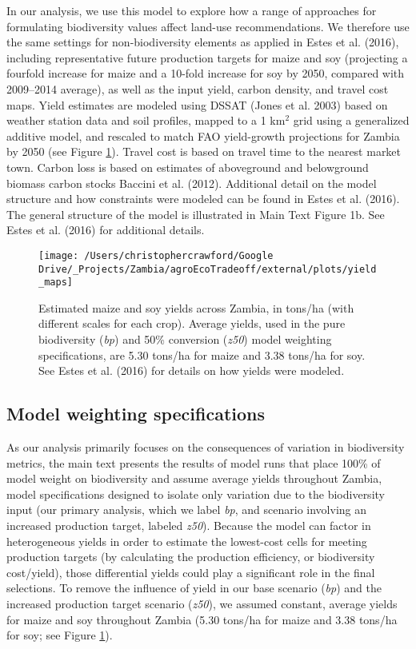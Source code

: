 \documentclass[
]{article}
\begin{document}
In our analysis, we use this model to explore how a range of approaches for formulating biodiversity values affect land-use recommendations. We therefore use the same settings for non-biodiversity elements as applied in Estes et al. (2016), including representative future production targets for maize and soy (projecting a fourfold increase for maize and a 10-fold increase for soy by 2050, compared with 2009--2014 average), as well as the input yield, carbon density, and travel cost maps. Yield estimates are modeled using DSSAT (Jones et al. 2003) based on weather station data and soil profiles, mapped to a 1 km\(^2\) grid using a generalized additive model, and rescaled to match FAO yield-growth projections for Zambia by 2050 (see Figure \ref{fig:yield}). Travel cost is based on travel time to the nearest market town. Carbon loss is based on estimates of aboveground and belowground biomass carbon stocks Baccini et al. (2012). Additional detail on the model structure and how constraints were modeled can be found in Estes et al. (2016). The general structure of the model is illustrated in Main Text Figure 1b. See Estes et al. (2016) for additional details.



\begin{figure}
\texttt{[image: /Users/christophercrawford/Google Drive/\_Projects/Zambia/agroEcoTradeoff/external/plots/yield\_maps]} \caption{Estimated maize and soy yields across Zambia, in tons/ha (with different scales for each crop). Average yields, used in the pure biodiversity (\emph{bp}) and 50\% conversion (\emph{z50}) model weighting specifications, are 5.30 tons/ha for maize and 3.38 tons/ha for soy. See Estes et al. (2016) for details on how yields were modeled.}\label{fig:yield}
\end{figure}

\hypertarget{model-weights}{%
\subsection{Model weighting specifications}\label{model-weights}}

As our analysis primarily focuses on the consequences of variation in biodiversity metrics, the main text presents the results of model runs that place 100\% of model weight on biodiversity and assume average yields throughout Zambia, model specifications designed to isolate only variation due to the biodiversity input (our primary analysis, which we label \emph{bp}, and scenario involving an increased production target, labeled \emph{z50}). Because the model can factor in heterogeneous yields in order to estimate the lowest-cost cells for meeting production targets (by calculating the production efficiency, or biodiversity cost/yield), those differential yields could play a significant role in the final selections. To remove the influence of yield in our base scenario (\emph{bp}) and the increased production target scenario (\emph{z50}), we assumed constant, average yields for maize and soy throughout Zambia (5.30 tons/ha for maize and 3.38 tons/ha for soy; see Figure \ref{fig:yield}).
\end{document}
